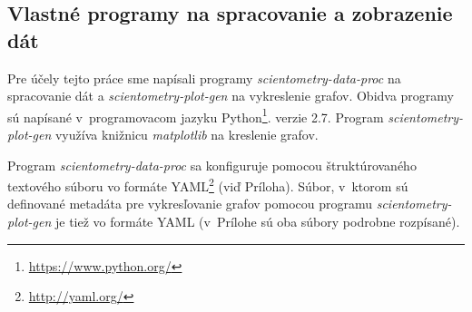 \subsection{Vlastné programy na spracovanie a zobrazenie dát}
\label{sec:program.my}

Pre účely tejto práce sme napísali programy \emph{scientometry-data-proc} na
spracovanie dát a \emph{scientometry-plot-gen} na vykreslenie grafov.  Obidva
programy sú napísané v~programovacom jazyku
Python\footnote{\url{https://www.python.org/}}. verzie 2.7.  Program
\emph{scientometry-plot-gen} využíva knižnicu \emph{matplotlib} na kreslenie
grafov.

Program \emph{scientometry-data-proc} sa konfiguruje pomocou štruktúrovaného
textového súboru vo formáte YAML\footnote{\url{http://yaml.org/}} (viď
Príloha). Súbor, v~ktorom sú definované metadáta pre vykresľovanie grafov
pomocou programu \emph{scientometry-plot-gen} je tiež vo formáte YAML (v~Prílohe
sú oba súbory podrobne rozpísané).


